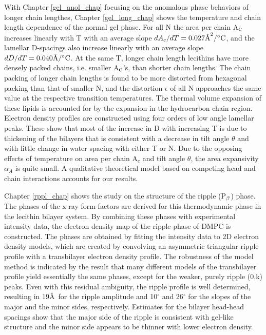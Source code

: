 With Chapter \ref{gel_anol_chap} focusing on the anomalous phase behaviors
of longer chain lengthes, Chapter \ref{gel_long_chap} shows the 
temperature and chain length dependence of the normal gel phase. For all 
N the area per chain A$_{\mbox c}$ increases linearly with T 
with an average slope \(dA_c/dT=0.027{\mbox \AA}^2/^{\circ}{\mbox C}\),
and the lamellar D-spacings also increase linearly 
with an average slope \(dD/dT=0.040{\mbox \AA}/^{\circ}{\mbox C}\).
At the same T, longer chain length lecithins have more densely packed 
chains, i.e. 
smaller A$_{\mbox c}$'s, than shorter chain lengths. 
The chain packing of longer chain lengths is found to be more distorted 
from hexagonal packing than that of smaller N, and the 
distortion $\epsilon$ of all N approaches the same value at the 
respective transition temperatures. The thermal volume expansion of 
these lipids 
is accounted for by the expansion in the hydrocarbon chain region. 
Electron density profiles are constructed using four orders of low angle 
lamellar peaks.  These show that most of the increase in D with increasing
T is due to thickening of the bilayers that is consistent with a
decrease in tilt angle $\theta$ and with little change in water spacing
with either T or N.  Due to the opposing effects of
temperature on area per chain A$_c$ and tilt angle
$\theta$, the area expansivity $\alpha_A$ is quite small.
A qualitative theoretical model based on competing head and chain 
interactions accounts for our results.

Chapter \ref{rppl_chap} shows the study on the structure of the ripple
(P$_{\beta '}$) phase. The phases of the x-ray form factors are 
derived for this thermodynamic phase in the lecithin bilayer system. 
By combining these phases with experimental intensity data, the electron 
density map of the ripple phase of DMPC is constructed. The phases are 
obtained by fitting the intensity data to 2D electron density models, 
which are created
by convolving an asymmetric triangular ripple profile with a transbilayer 
electron density profile.  The robustness of the model method
is indicated by the result that many different models of the
transbilayer profile yield essentially the same phases, except
for the weaker, purely ripple (0,k) peaks.  Even with this
residual ambiguity, the ripple profile is well determined, resulting in
19\AA\ for the ripple amplitude and 10$^{\circ}$ and 26$^{\circ}$ 
for the slopes of the major and the minor sides,
respectively.   Estimates for the bilayer head-head spacings
show that the major side of the ripple is consistent with gel-like structure
and the minor side appears to be thinner with lower electron density.
